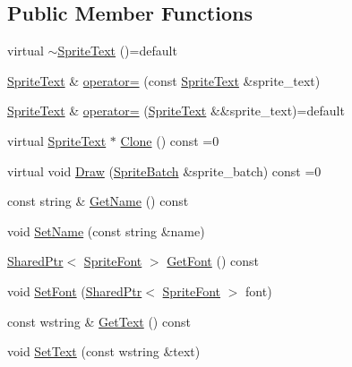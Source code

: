 \subsection*{Public Member Functions}
\begin{DoxyCompactItemize}
\item 
virtual \hyperlink{classmage_1_1_sprite_text_a0a231f260bb855b7be3280aa74a3e5c6}{$\sim$\+Sprite\+Text} ()=default
\item 
\hyperlink{classmage_1_1_sprite_text}{Sprite\+Text} \& \hyperlink{classmage_1_1_sprite_text_acc41212e9847babd95afa68aedf2ad42}{operator=} (const \hyperlink{classmage_1_1_sprite_text}{Sprite\+Text} \&sprite\+\_\+text)
\item 
\hyperlink{classmage_1_1_sprite_text}{Sprite\+Text} \& \hyperlink{classmage_1_1_sprite_text_a48e9d2fdda8bf2f8847a425444df980c}{operator=} (\hyperlink{classmage_1_1_sprite_text}{Sprite\+Text} \&\&sprite\+\_\+text)=default
\item 
virtual \hyperlink{classmage_1_1_sprite_text}{Sprite\+Text} $\ast$ \hyperlink{classmage_1_1_sprite_text_ac4edf927911a9fb8e5c3a674b217637a}{Clone} () const =0
\item 
virtual void \hyperlink{classmage_1_1_sprite_text_a45d5ac8410d5a46b26e8491946a2ad9e}{Draw} (\hyperlink{classmage_1_1_sprite_batch}{Sprite\+Batch} \&sprite\+\_\+batch) const =0
\item 
const string \& \hyperlink{classmage_1_1_sprite_text_ab9f289c7c70988da6acf031108ad4934}{Get\+Name} () const
\item 
void \hyperlink{classmage_1_1_sprite_text_a48324e6a5f896b11701ad5b0f8ab3ad1}{Set\+Name} (const string \&name)
\item 
\hyperlink{namespacemage_a1e01ae66713838a7a67d30e44c67703e}{Shared\+Ptr}$<$ \hyperlink{classmage_1_1_sprite_font}{Sprite\+Font} $>$ \hyperlink{classmage_1_1_sprite_text_a1c80933525f87fe4dced9479c1b79764}{Get\+Font} () const
\item 
void \hyperlink{classmage_1_1_sprite_text_a8e753dcd210b1fdf9c5399a9f0f3415d}{Set\+Font} (\hyperlink{namespacemage_a1e01ae66713838a7a67d30e44c67703e}{Shared\+Ptr}$<$ \hyperlink{classmage_1_1_sprite_font}{Sprite\+Font} $>$ font)
\item 
const wstring \& \hyperlink{classmage_1_1_sprite_text_a48587554bd7f6536aa95cf8dd681ebfb}{Get\+Text} () const
\item 
void \hyperlink{classmage_1_1_sprite_text_ac33e512ab29554a306ada9a378ab00eb}{Set\+Text} (const wstring \&text)
\item 

\end{DoxyCompactItemize}
